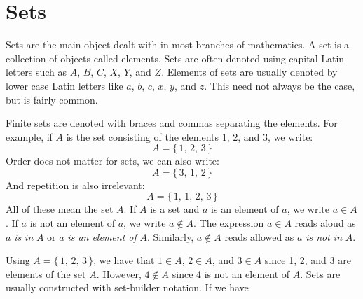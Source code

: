 \documentclass{article}
\theoremstyle{plain}
\theoremstyle{normal}
\newenvironment{example}{%
    \pushQED{\qed}\renewcommand{\qedsymbol}{$\blacksquare$}\examplex%
}{%
    \popQED\endexamplex%
}
\newenvironment{definition}{%
    \pushQED{\qed}\renewcommand{\qedsymbol}{$\blacksquare$}\definitionx%
}{%
    \popQED\enddefinitionx%
}
\newenvironment{notation}{%
    \pushQED{\qed}\renewcommand{\qedsymbol}{$\blacksquare$}\notationx%
}{%
    \popQED\endnotationx%
}
\begin{document}
    \section{Sets}
        Sets are the main object dealt with in most branches of mathematics.
        \begin{definition}[\textbf{Set}]
            A set is a collection of objects called elements.
        \end{definition}
        Sets are often denoted using capital Latin letters such as
        $A$, $B$, $C$, $X$, $Y$, and $Z$. Elements of sets are usually denoted
        by lower case Latin letters like $a$, $b$, $c$, $x$, $y$, and $z$. This
        need not always be the case, but is fairly common.
        \begin{example}
            Finite sets are denoted with braces and commas separating the
            elements. For example, if $A$ is the set consisting of the elements
            1, 2, and 3, we write:
            \begin{equation}
                A=\{\,1,\,2,\,3\,\}
            \end{equation}
            Order does not matter for sets, we can also write:
            \begin{equation}
                A=\{\,3,\,1,\,2\,\}
            \end{equation}
            And repetition is also irrelevant:
            \begin{equation}
                A=\{\,1,\,1,\,2,\,3\,\}
            \end{equation}
            All of these mean the set $A$.
        \end{example}
        \begin{notation}[\textbf{Containment}]
            If $A$ is a set and $a$ is an element of $a$, we write
            $a\in{A}$. If $a$ is not an element of $a$, we write
            $a\notin{A}$.
        \end{notation}
        The expression $a\in{A}$ reads aloud as
        $a$ \textit{is in} $A$ or $a$ \textit{is an element of} $A$. Similarly,
        $a\notin{A}$ reads allowed as $a$ \textit{is not in} $A$.
        \begin{example}
            Using $A=\{\,1,\,2,\,3\,\}$, we have that
            $1\in{A}$, $2\in{A}$, and $3\in{A}$ since 1, 2, and 3 are elements
            of the set $A$. However, $4\notin{A}$ since 4 is not an element of
            $A$.
        \end{example}
        Sets are usually constructed with set-builder notation. If we have
\end{document}
